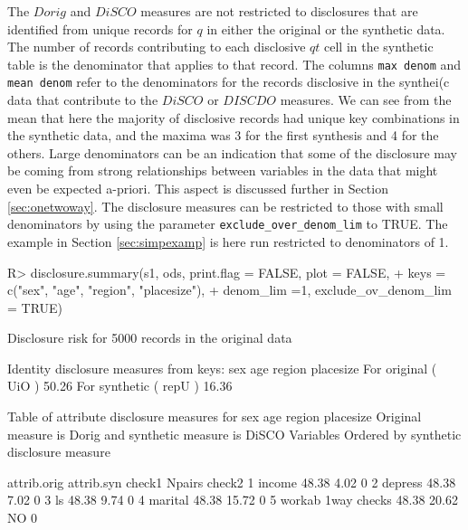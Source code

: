 \documentclass[12pt]{article}
\renewcommand{\baselinestretch}{1.5} %
\begin{document}
The $Dorig$ and $DiSCO$ measures are not restricted to disclosures that are identified from unique records for $q$ in either the original or the synthetic data. The number of records contributing to each disclosive $qt$ cell in the synthetic table is the denominator that applies to that record. The columns \texttt{max denom} and \texttt{mean denom} refer to the denominators for the records disclosive in the synthei(c data that contribute to the $DiSCO$ or $DISCDO$ measures. We can see from the mean that here the majority of disclosive records had unique key combinations in the synthetic data, and the maxima was 3 for the first synthesis and 4 for the others. Large denominators can be an indication that some of the disclosure may be coming from strong relationships between variables in the data that might even be expected 
a-priori. This aspect is discussed further in Section \ref{sec:onetwoway}. The disclosure measures can be restricted to those with small denominators by using
the parameter \texttt{exclude\_over\_denom\_lim} to TRUE. The example in Section \ref{sec:simpexamp} is here run restricted to denominators of 1.
\renewcommand{\baselinestretch}{1.0}
\begin{Schunk}
\begin{Sinput}
R> disclosure.summary(s1, ods, print.flag = FALSE, plot = FALSE,
+    keys = c("sex", "age", "region", "placesize"),
+    denom_lim =1, exclude_ov_denom_lim = TRUE)
\end{Sinput}
\begin{Soutput}
Disclosure risk for 5000 records in the original data

Identity disclosure measures
from keys: sex age region placesize 
For original  ( UiO )  50.26 %
For synthetic ( repU ) 16.36 %

Table of attribute disclosure measures for sex age region placesize 
Original measure is  Dorig and synthetic measure is DiSCO 
Variables Ordered by synthetic disclosure measure

                     attrib.orig attrib.syn check1 Npairs check2
1 income                   48.38       4.02             0       
2 depress                  48.38       7.02             0       
3 ls                       48.38       9.74             0       
4 marital                  48.38      15.72             0       
5 workab 1way checks       48.38      20.62     NO      0       
\end{Soutput}
\end{Schunk}
\renewcommand{\baselinestretch}{1.5}
\end{document}
